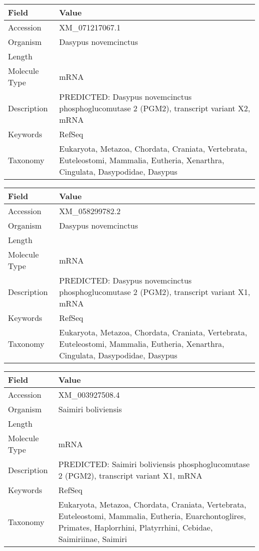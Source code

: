\documentclass[10pt]{article}
\begin{document}
{\footnotesize
\begin{longtable}{>{\raggedright\arraybackslash}p{4.5cm} >{\raggedright\arraybackslash}p{11.5cm}}
\textbf{Field} & \textbf{Value} \\
\hline
Accession & XM\_071217067.1 \\
Organism & Dasypus novemcinctus \\
Length & 5174 \\
Molecule Type & mRNA \\
Description & PREDICTED: Dasypus novemcinctus phosphoglucomutase 2 (PGM2), transcript variant X2, mRNA \\
Keywords & RefSeq \\
Taxonomy & Eukaryota, Metazoa, Chordata, Craniata, Vertebrata, Euteleostomi, Mammalia, Eutheria, Xenarthra, Cingulata, Dasypodidae, Dasypus \\
\end{longtable}
}

{\footnotesize
\begin{longtable}{>{\raggedright\arraybackslash}p{4.5cm} >{\raggedright\arraybackslash}p{11.5cm}}
\textbf{Field} & \textbf{Value} \\
\hline
Accession & XM\_058299782.2 \\
Organism & Dasypus novemcinctus \\
Length & 4829 \\
Molecule Type & mRNA \\
Description & PREDICTED: Dasypus novemcinctus phosphoglucomutase 2 (PGM2), transcript variant X1, mRNA \\
Keywords & RefSeq \\
Taxonomy & Eukaryota, Metazoa, Chordata, Craniata, Vertebrata, Euteleostomi, Mammalia, Eutheria, Xenarthra, Cingulata, Dasypodidae, Dasypus \\
\end{longtable}
}

{\footnotesize
\begin{longtable}{>{\raggedright\arraybackslash}p{4.5cm} >{\raggedright\arraybackslash}p{11.5cm}}
\textbf{Field} & \textbf{Value} \\
\hline
Accession & XM\_003927508.4 \\
Organism & Saimiri boliviensis \\
Length & 2833 \\
Molecule Type & mRNA \\
Description & PREDICTED: Saimiri boliviensis phosphoglucomutase 2 (PGM2), transcript variant X1, mRNA \\
Keywords & RefSeq \\
Taxonomy & Eukaryota, Metazoa, Chordata, Craniata, Vertebrata, Euteleostomi, Mammalia, Eutheria, Euarchontoglires, Primates, Haplorrhini, Platyrrhini, Cebidae, Saimiriinae, Saimiri \\
\end{longtable}
}
\end{document}
